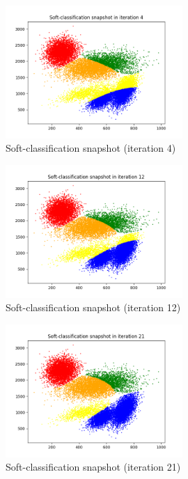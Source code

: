 \documentclass[12pt,a4paper]{article}
\begin{document}
\begin{enumerate}[start=2,label*={\arabic*.}]
\begin{figure}[H]
  \centering
  \includegraphics[width=0.6\textwidth]{figures/sc_4.png}
	\caption{Soft-classification snapshot (iteration 4)}
	\label{sc_1}
\end{figure}

\begin{figure}[H]
  \centering
  \includegraphics[width=0.6\textwidth]{figures/sc_12.png}
	\caption{Soft-classification snapshot (iteration 12)}
	\label{sc_12}
\end{figure}

\begin{figure}[H]
  \centering
  \includegraphics[width=0.6\textwidth]{figures/sc_21.png}
	\caption{Soft-classification snapshot (iteration 21)}
	\label{sc_21}
\end{figure}


\end{enumerate}
\end{document}

